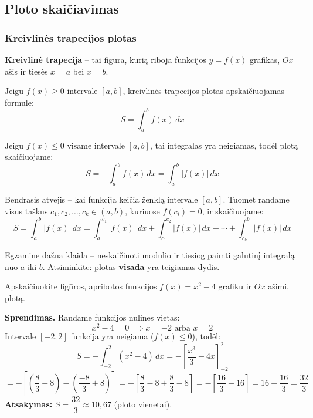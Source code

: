 \subsection{Ploto skaičiavimas}

\subsubsection{Kreivlinės trapecijos plotas}

\begin{definition}
\textbf{Kreivlinė trapecija} – tai figūra, kurią riboja funkcijos $y = f(x)$ grafikas, $Ox$ ašis ir tiesės $x = a$ bei $x = b$.
\end{definition}

Jeigu $f(x) \geq 0$ intervale $[a, b]$, kreivlinės trapecijos plotas apskaičiuojamas formule:
\[
S = \int_a^b f(x)\, dx
\]

Jeigu $f(x) \leq 0$ visame intervale $[a, b]$, tai integralas yra neigiamas, todėl plotą skaičiuojame:
\[
S = -\int_a^b f(x)\, dx = \int_a^b |f(x)|\, dx
\]

Bendrasis atvejis – kai funkcija keičia ženklą intervale $[a, b]$. Tuomet randame visus taškus $c_1, c_2, \ldots, c_k \in (a, b)$, kuriuose $f(c_i) = 0$, ir skaičiuojame:
\[
S = \int_a^b |f(x)|\, dx = \int_a^{c_1} |f(x)|\, dx + \int_{c_1}^{c_2} |f(x)|\, dx + \cdots + \int_{c_k}^{b} |f(x)|\, dx
\]

\begin{remark}
Egzamine dažna klaida – neskaičiuoti modulio ir tiesiog paimti galutinį integralą nuo $a$ iki $b$. Atsiminkite: plotas \textbf{visada} yra teigiamas dydis.
\end{remark}

\begin{example}
Apskaičiuokite figūros, apribotos funkcijos $f(x) = x^2 - 4$ grafiku ir $Ox$ ašimi, plotą.

\textbf{Sprendimas.} Randame funkcijos nulines vietas:
\[
x^2 - 4 = 0 \implies x = -2 \text{ arba } x = 2
\]
Intervale $[-2, 2]$ funkcija yra neigiama ($f(x) \leq 0$), todėl:
\[
S = -\int_{-2}^{2}(x^2 - 4)\, dx = -\left[\frac{x^3}{3} - 4x\right]_{-2}^{2}
\]
\[
= -\left[\left(\frac{8}{3} - 8\right) - \left(\frac{-8}{3} + 8\right)\right] = -\left[\frac{8}{3} - 8 + \frac{8}{3} - 8\right]
= -\left[\frac{16}{3} - 16\right] = 16 - \frac{16}{3} = \frac{32}{3}
\]
\textbf{Atsakymas:} $S = \dfrac{32}{3} \approx 10{,}67$ (ploto vienetai).
\end{example}

